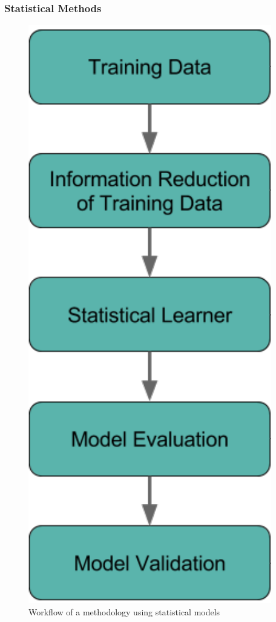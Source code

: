 \begin{frame}
  \frametitle{Statistical Methods}
  \begin{minipage}{0.5\textwidth}
    \begin{figure}
      \centering
      \includegraphics[height=0.6\textheight]{./figures/statmethodology.png}
      \caption{Workflow of a  methodology using statistical models}

\end{figure}
\end{minipage}
\end{frame}
